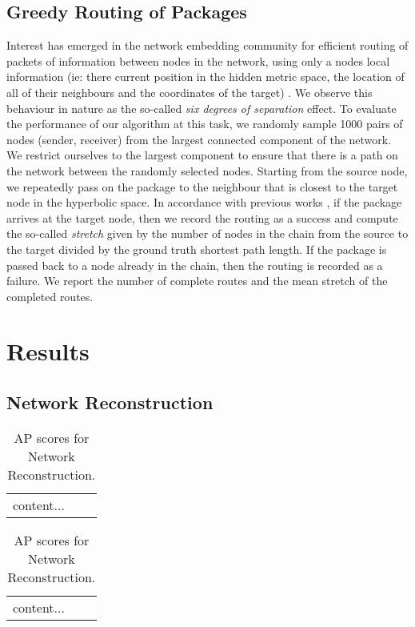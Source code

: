 \documentclass{article}
\begin{document}
\subsection{Greedy Routing of Packages}
Interest has emerged in the network embedding community for efficient routing of packets of information between nodes in the network, using only a nodes local information (ie: there current position in the hidden metric space, the location of all of their neighbours and the coordinates of the target) \cite{kleinberg2007geographic,boguna2010sustaining,bianconi2017emergent,kleineberg2017collective}.
We observe this behaviour in nature as the so-called \textit{six degrees of separation} effect.
To evaluate the performance of our algorithm at this task, we randomly sample 1000 pairs of nodes (sender, receiver) from the largest connected component of the network.
We restrict ourselves to the largest component to ensure that there is a path on the network between the randomly selected nodes. 
Starting from the source node, we repeatedly pass on the package to the neighbour that is closest to the target node in the hyperbolic space.
In accordance with previous works \cite{kleinberg2007geographic,boguna2010sustaining,bianconi2017emergent}, if the package arrives at the target node, then we record the routing as a success and compute the so-called \textit{stretch}  given by the number of nodes in the chain from the source to the target divided by the ground truth shortest path length.
If the package is passed back to a node already in the chain, then the routing is recorded as a failure.
We report the number of complete routes and the mean stretch of the completed routes.

\section{Results}

\subsection{Network Reconstruction}

\begin{table}
	\centering
	\begin{tabular}{c | c | c  }
		content...
	\end{tabular}
	\caption{AUROC scores for Network Reconstruction.}
	\begin{tabular}{c | c | c }
		content...
	\end{tabular}
	\caption{AP scores for Network Reconstruction.}
	\label{reconstructionResults}
\end{table}
\end{document}
